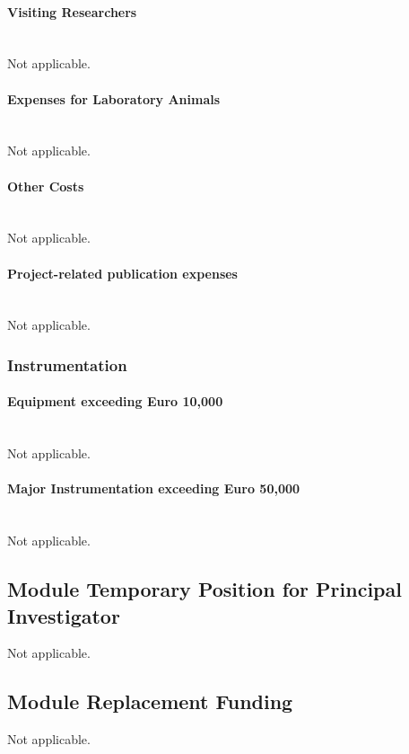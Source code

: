 \documentclass[a4paper,11pt,headings=normal]{scrartcl}
\begin{document}
\paragraph{Visiting Researchers }\ \\
Not applicable. 

\paragraph{Expenses for Laboratory Animals}\ \\
Not applicable. 

\paragraph{Other Costs}\ \\
Not applicable. 

\paragraph{Project-related publication expenses}\ \\
Not applicable. 

	
\subsubsection{Instrumentation}
\paragraph{Equipment exceeding Euro 10,000}\ \\
Not applicable. 

\paragraph{Major Instrumentation exceeding Euro 50,000}\ \\
Not applicable. 


\subsection{Module Temporary Position for Principal Investigator}
Not applicable. 

\subsection{Module Replacement Funding}
Not applicable. 
\end{document}
